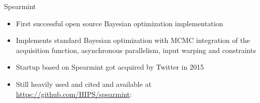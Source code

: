 
\begin{frame}[c]{Spearmint }

\small
\begin{itemize}
    \item First successful open source Bayesian optimization implementation     
    \item Implements standard Bayesian optimization with MCMC integration of the acquisition function, asynchronous parallelism, 
    input warping 
    and constraints
    \item \alert{Startup based on Spearmint got acquired by Twitter in 2015}
    \item Still heavily used and cited and available at \url{https://github.com/HIPS/spearmint}:
    \begin{center}
        
        
    \end{center}
\end{itemize}
\end{frame}

